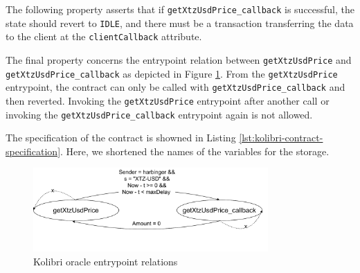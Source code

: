 \documentclass[a4paper,USenglish,cleveref, autoref, thm-restate]{lipics-v2021}
\begin{document}
The following property asserts that if \lstinline/getXtzUsdPrice_callback/ is successful, the state should revert to \lstinline/IDLE/, and there must be a transaction transferring the data to the client at the \lstinline/clientCallback/ attribute. 

The final property concerns the entrypoint relation between
\lstinline/getXtzUsdPrice/ and \lstinline/getXtzUsdPrice_callback/ as
depicted in Figure \ref{fig:kolibri-oracle-emtrypoint-relations}. From
the \lstinline/getXtzUsdPrice/ entrypoint, the contract can only be
called with \lstinline/getXtzUsdPrice_callback/ and then
reverted. Invoking the \lstinline/getXtzUsdPrice/ entrypoint after
another call or invoking the \lstinline/getXtzUsdPrice_callback/
entrypoint again is not allowed. 

The specification of  the contract is showned in Listing \ref{lst:kolibri-contract-specification}. Here, we shortened the names of the variables for the storage.
\begin{figure}[tp]
    \centering
    \includegraphics[width=0.8\textwidth]{kolibri}
    \caption{Kolibri oracle entrypoint relations}
    \label{fig:kolibri-oracle-emtrypoint-relations}
\end{figure}
\end{document}
